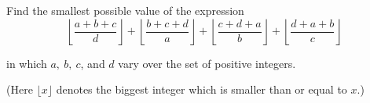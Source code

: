Find the smallest possible value of the expression \[\left\lfloor\frac{a+b+c}{d}\right\rfloor+\left\lfloor\frac{b+c+d}{a}\right\rfloor+\left\lfloor\frac{c+d+a}{b}\right\rfloor+\left\lfloor\frac{d+a+b}{c}\right\rfloor\]

in which $a,~ b,~ c$,  and $d$ vary over the set of positive integers.

(Here $\lfloor x\rfloor$ denotes the biggest integer which is smaller than or equal to $x$.)